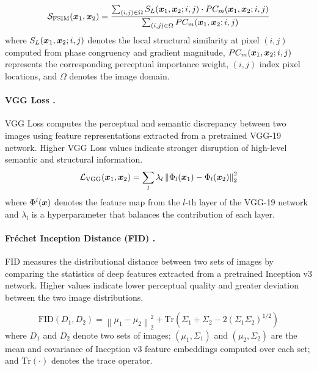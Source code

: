 \documentclass{article}
\begin{document}
\begin{equation}
{\mathcal{S}}_\mathrm{FSIM}({\bm{x}}_1,{\bm{x}}_2) = \frac{\sum_{(i,j)\in\Omega} S_L({\bm{x}}_1,{\bm{x}}_2;i,j)\cdot PC_m({\bm{x}}_1,{\bm{x}}_2;i,j)}{\sum_{(i,j)\in\Omega} PC_m({\bm{x}}_1,{\bm{x}}_2;i,j)}
\label{eq:fsim}
\end{equation}
\noindent where $S_L({\bm{x}}_1,{\bm{x}}_2;i,j)$ denotes the local structural similarity at pixel $(i,j)$ computed from phase congruency and gradient magnitude, $PC_m({\bm{x}}_1,{\bm{x}}_2;i,j)$ represents the corresponding perceptual importance weight, $(i,j)$ index pixel locations, and $\Omega$ denotes the image domain.

\paragraph{VGG Loss .}
VGG Loss computes the perceptual and semantic discrepancy between two images using feature representations extracted from a pretrained VGG-19 network. Higher VGG Loss values indicate stronger disruption of high-level semantic and structural information.
\begin{equation}
\mathcal{L}_{\mathrm{VGG}}({\bm{x}}_1,{\bm{x}}_2) = \sum_{l} \lambda_l \left\| \Phi_l({\bm{x}}_1) - \Phi_l({\bm{x}}_2) \right\|_2^2
\label{eq:vgg_loss}
\end{equation}
\noindent where $\Phi^l({\bm{x}})$ denotes the feature map from the $l$-th layer of the VGG-19 network and $\lambda_l$ is a hyperparameter that balances the contribution of each layer.

\paragraph{Fréchet Inception Distance (FID) .}
FID measures the distributional distance between two sets of images by comparing the statistics of deep features extracted from a pretrained Inception v3 network. Higher values indicate lower perceptual quality and greater deviation between the two image distributions.

\begin{equation}
\mathrm{FID}(D_1, D_2) = \left\| \mu_{1} - \mu_{2} \right\|_2^2 + \mathrm{Tr}\!\left(\Sigma_{1} + \Sigma_{2} - 2(\Sigma_{1}\Sigma_{2})^{1/2}
\right)
\label{eq:fid}
\end{equation}
\noindent
where $D_1$ and $D_2$ denote two sets of images; $(\mu_{1}, \Sigma_{1})$ and $(\mu_{2}, \Sigma_{2})$ are the mean and covariance of Inception v3 feature embeddings computed over each set; and $\mathrm{Tr}(\cdot)$ denotes the trace operator.
\end{document}

